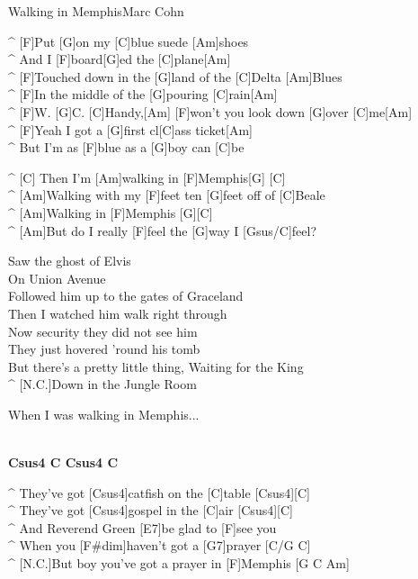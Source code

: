 \begin{song}{Walking in Memphis}{Marc Cohn}

\begin{guitar}
^ [F]Put [G]on my [C]blue suede [Am]shoes\\
^ And I [F]board[G]ed the [C]plane[Am] \\
^ [F]Touched down in the [G]land of the [C]Delta [Am]Blues \\
^ [F]In the middle of the [G]pouring [C]rain[Am]\\
^ [F]W. [G]C. [C]Handy,[Am]   [F]won't you look down [G]over [C]me[Am] \\
^ [F]Yeah I got a [G]first cl[C]ass ticket[Am] \\
^ But I'm as [F]blue as a [G]boy can [C]be \\
\end{guitar}

\smallskip
{}
\begin{guitar}
^ [C] Then I'm [Am]walking in [F]Memphis[G] [C]\\
^ [Am]Walking with my [F]feet ten [G]feet off of [C]Beale \\
^ [Am]Walking in [F]Memphis [G][C]\\
^ [Am]But do I really [F]feel the [G]way I [Gsus/C]feel? \\
\end{guitar}

\medskip
\begin{guitar}
Saw the ghost of Elvis \\
On Union Avenue\\
Followed him up to the gates of Graceland \\
Then I watched him walk right through \\
Now security they did not see him \\
They just hovered 'round his tomb \\
But there's a pretty little thing, Waiting for the King \\
^ [N.C.]Down in the Jungle Room \\
\end{guitar}

\smallskip
{}
\begin{guitar}
When I was walking in Memphis...\\
\end{guitar}

\smallskip
{}\\
\textbf{Csus4 C Csus4 C}
\begin{guitar}
^ They've got [Csus4]catfish on the [C]table [Csus4][C]\\
^ They've got [Csus4]gospel in the [C]air [Csus4][C]\\
^ And Reverend Green [E7]be glad to [F]see you \\
^ When you [F#dim]haven't got a [G7]prayer [C/G C]\\
^ [N.C.]But boy you've got a prayer in [F]Memphis [G C Am]\\
\end{guitar}


\end{song}

